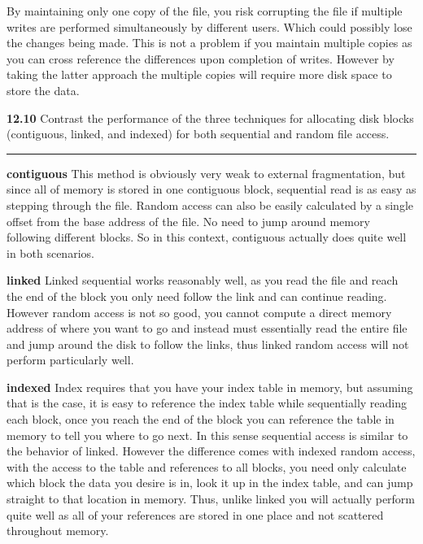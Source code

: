 \documentclass[12pt]{jhwhw}
\begin{document}
	\begin{addmargin}[1em]{}
		By maintaining only one copy of the file, you risk corrupting the file
		if multiple writes are performed simultaneously by different users.
		Which could possibly lose the changes being made. This is not a problem
		if you maintain multiple copies as you can cross reference the differences
		upon completion of writes. However by taking the latter approach the multiple
		copies will require more disk space to store the data.
	\end{addmargin}
\bigbreak
\textbf{12.10}  
	Contrast the performance of the three techniques for allocating disk blocks
	(contiguous, linked, and indexed) for both sequential and random file
	access.
\textcolor[RGB]{240,240,240}{\rule{\textwidth}{0.5pt}}\bigbreak

	\begin{addmargin}[1em]{}
		\textbf{contiguous}
			This method is obviously very weak to external fragmentation,
			but since all of memory is stored in one contiguous block, sequential
			read is as easy as stepping through the file. Random access can also
			be easily calculated by a single offset from the base address of the file.
			No need to jump around memory following different blocks.
			So in this context, contiguous actually does quite well in both 
			scenarios.

		\bigbreak
		\textbf{linked}
			Linked sequential works reasonably well, as you read the file and
			reach the end of the block you only need follow the link and can
			continue reading. However random access is not so good, you cannot
			compute a direct memory address of where you want to go and instead
			must essentially read the entire file and jump around the disk to follow
			the links, thus linked random access will not perform particularly well.

		\bigbreak
		\textbf{indexed}
			Index requires that you have your index table in memory, but assuming
			that is the case, it is easy to reference the index table while
			sequentially reading each block, once you reach the end of the block
			you can reference the table in memory to tell you where to go next.
			In this sense sequential access is similar to the behavior of linked.
			However the difference comes with indexed random access, with the 
			access to the table and references to all blocks, you need only
			calculate which block the data you desire is in, look it up in the index 
			table, and can jump straight to that location in memory. Thus, unlike
			linked you will actually perform quite well as all of your references
			are stored in one place and not scattered throughout memory.
	\end{addmargin}
\end{document}
